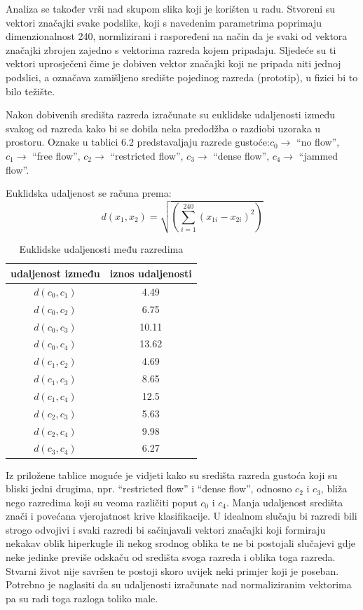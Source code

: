 \documentclass[times, utf8, zavrsni]{fer}
\begin{document}
Analiza se također vrši nad skupom slika koji je korišten u radu. Stvoreni su vektori
značajki svake podslike, koji s navedenim parametrima poprimaju dimenzionalnost 240, 
normlizirani i raspoređeni na način da je svaki
od vektora značajki zbrojen zajedno s vektorima razreda kojem pripadaju.
Sljedeće su ti vektori uprosječeni čime je dobiven vektor značajki 
koji ne pripada niti jednoj podslici, a označava zamišljeno središte
pojedinog razreda (prototip), u fizici bi to bilo težište. 

\bigbreak

Nakon dobivenih središta razreda izračunate su euklidske udaljenosti između svakog
od razreda kako bi se dobila neka predodžba o razdiobi uzoraka u prostoru. 
Oznake u tablici 6.2 predstavaljaju razrede gustoće:\( c_0 \rightarrow \) \enquote{no flow},
\( c_1 \rightarrow \) \enquote{free flow}, \( c_2 \rightarrow \) \enquote{restricted flow}, 
\( c_3 \rightarrow \) \enquote{dense flow}, \( c_4 \rightarrow \) \enquote{jammed flow}.

Euklidska udaljenost se računa prema:
\[
d(x_1, x_2) = \sqrt{\left(\sum_{i=1}^{240} \left(x_{1i}-x_{2i}\right)^2\right)}
\]

\begin{table}[ht]
\centering
\begin{tabular}{c|c}
udaljenost između & iznos udaljenosti \\
\hline
\(d(c_0, c_1)\) & 4.49 \\
\(d(c_0, c_2)\) & 6.75 \\
\(d(c_0, c_3)\) & 10.11 \\
\(d(c_0, c_4)\) & 13.62 \\
\(d(c_1, c_2)\) & 4.69 \\
\(d(c_1, c_3)\) & 8.65 \\
\(d(c_1, c_4)\) & 12.5 \\
\(d(c_2, c_3)\) & 5.63 \\
\(d(c_2, c_4)\) & 9.98 \\
\(d(c_3, c_4)\) & 6.27
\end{tabular}
\caption{Euklidske udaljenosti među razredima} 
\end{table}

Iz priložene tablice moguće je vidjeti kako su središta razreda gustoća koji su bliski jedni drugima, npr.
\enquote{restricted flow} i \enquote{dense flow}, odnosno \(c_2\) i \(c_3\), bliža 
nego razredima koji su veoma različiti poput \(c_0\) i \(c_4\). Manja udaljenost središta znači
i povećana vjerojatnost krive klasifikacije. U idealnom slučaju bi razredi bili strogo odvojivi
i svaki razredi bi sačinjavali vektori značajki koji formiraju nekakav oblik hiperkugle ili nekog srodnog oblika
te ne bi postojali slučajevi gdje neke jedinke previše odskaču od središta svoga razreda i oblika toga razreda.
Stvarni život nije savršen te postoji skoro uvijek neki primjer koji je poseban.  Potrebno je naglasiti da
su udaljenosti izračunate nad normaliziranim vektorima pa su radi toga razloga toliko male.
\end{document}
